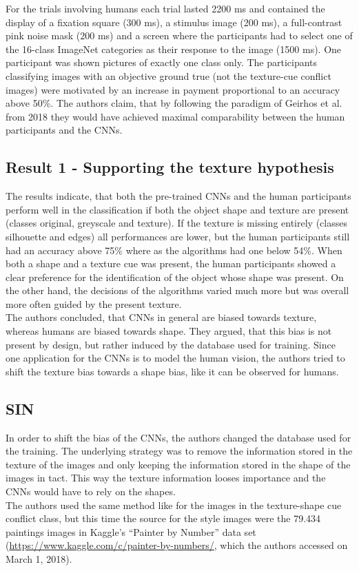 \documentclass[runningheads,a4paper]{llncs}
\begin{document}
For the trials involving humans each trial lasted 2200 ms and contained the display of a fixation square (300 ms), a stimulus image (200 ms), a full-contrast pink noise mask (200 ms) and a screen where the participants had to select one of the 16-class ImageNet categories as their response to the image (1500 ms). One participant was shown pictures of exactly one class only. The participants classifying images with an objective ground true (not the texture-cue conflict images) were motivated by an increase in payment proportional to an accuracy above 50\%. The authors claim, that by following the paradigm of Geirhos et al. from 2018 they would have achieved maximal comparability between the human participants and the CNNs.

\subsection{Result 1 - Supporting the texture hypothesis}
The results indicate, that both the pre-trained CNNs and the human participants perform well in the classification if both the object shape and texture are present (classes original, greyscale and texture). If the texture is missing entirely (classes silhouette and edges) all performances are lower, but the human participants still had an accuracy above 75\% where as the algorithms had one below 54\%.%
When both a shape and a texture cue was present, the human participants showed a clear preference for the identification of the object whose shape was present. On the other hand, the decisions of the algorithms varied much more but was overall more often guided by the present texture.\\ %

The authors concluded, that CNNs in general are biased towards texture, whereas humans are biased towards shape. They argued, that this bias is not present by design, but rather  induced by the database used for training. Since one application for the CNNs is to model the human vision, the authors tried to shift the texture bias towards a shape bias, like it can be observed for humans.

\subsection{SIN}
In order to shift the bias of the CNNs, the authors changed the database used for the training. The underlying strategy was to remove the information stored in the texture of the images and only keeping the information stored in the shape of the images in tact. This way the texture information looses importance and the CNNs would have to rely on the shapes.\\
The authors used the same method like for the images in the texture-shape cue conflict class, but this time the source for the style images were the 79.434 paintings images in Kaggle's ``Painter by Number'' data set (\url{https://www.kaggle.com/c/painter-by-numbers/}, which the authors accessed on March 1, 2018).\\
\end{document}
